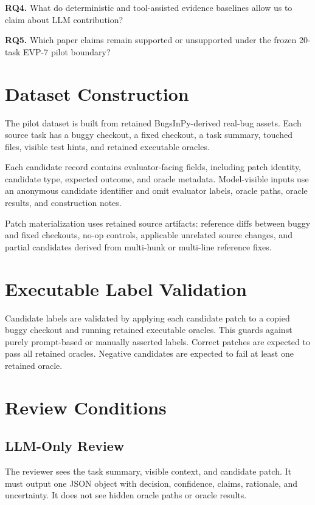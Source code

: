 \documentclass[conference]{IEEEtran}
\begin{document}
\textbf{RQ4.} What do deterministic and tool-assisted evidence baselines
allow us to claim about LLM contribution?

\textbf{RQ5.} Which paper claims remain supported or unsupported under the
frozen 20-task EVP-7 pilot boundary?

\section{Dataset Construction}

The pilot dataset is built from retained BugsInPy-derived real-bug assets. Each
source task has a buggy checkout, a fixed checkout, a task summary, touched
files, visible test hints, and retained executable oracles.

Each candidate record contains evaluator-facing fields, including patch
identity, candidate type, expected outcome, and oracle metadata. Model-visible
inputs use an anonymous candidate identifier and omit evaluator labels, oracle
paths, oracle results, and construction notes.

Patch materialization uses retained source artifacts: reference diffs between
buggy and fixed checkouts, no-op controls, applicable unrelated source changes,
and partial candidates derived from multi-hunk or multi-line reference fixes.

\section{Executable Label Validation}

Candidate labels are validated by applying each candidate patch to a copied
buggy checkout and running retained executable oracles. This guards against
purely prompt-based or manually asserted labels. Correct patches are expected
to pass all retained oracles. Negative candidates are expected to fail at least
one retained oracle.

\section{Review Conditions}

\subsection{LLM-Only Review}

The reviewer sees the task summary, visible context, and candidate patch. It
must output one JSON object with decision, confidence, claims, rationale, and
uncertainty. It does not see hidden oracle paths or oracle results.
\end{document}
